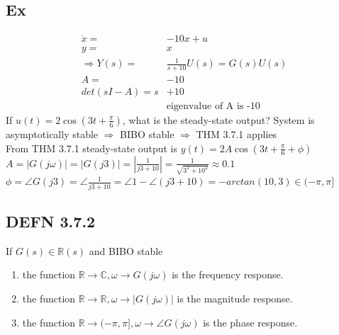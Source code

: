 \documentclass[letterpaper]{article}
\begin{document}
\subsection*{Ex}
\begin{align*}
	\dot x=           & -10x+u                        \\
	y=                & x                             \\
	\Rightarrow Y(s)= & \frac{1}{s+10}U(s)=G(s)U(s)   \\
	A=                & -10                           \\
	det(sI-A)=s       & +10                           \\
	                  & \text{eigenvalue of A is -10} 
\end{align*}
If $u(t)=2\cos(3t+\frac{\pi}{6})$, what is the steady-state output?
System is asymptotically stable $\Rightarrow$ BIBO stable $\Rightarrow$ THM 3.7.1 applies\\
From THM 3.7.1 steady-state output is $y(t)=2A\cos(3t+\frac{\pi}{6}+\phi)$\\
$A=|G(j\omega)|=|G(j3)|=|\frac{1}{j3+10}|=\frac{1}{\sqrt{3^2+10^2}}\approx 0.1$\
$\phi=\angle G(j3)=\angle \frac{1}{j3+10}=\angle 1-\angle (j3+10)=-arctan(10,3)\in (-\pi,\pi]$

\subsection*{DEFN 3.7.2}
If $G(s) \in \mathbb{R}(s)$ and BIBO stable
\begin{enumerate}
	\item the function $\mathbb{R} \rightarrow \mathbb{C}, \omega\rightarrow G(j\omega)$ is the frequency response.
	\item the function $\mathbb{R} \rightarrow \mathbb{R},\omega\rightarrow|G(j\omega)|$ is the magnitude response.
	\item the function $\mathbb{R}\rightarrow (-\pi,\pi], \omega \rightarrow \angle G(j\omega)$ is the phase response.
\end{enumerate}
\end{document}
